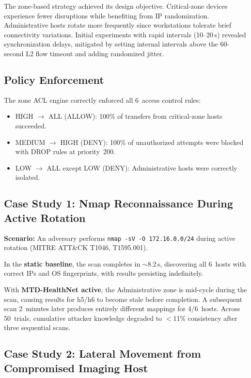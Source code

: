 \documentclass[conference]{IEEEtran}
\begin{document}
The zone-based strategy achieved its design objective. Critical-zone devices experience fewer disruptions while benefiting from IP randomization. Administrative hosts rotate more frequently since workstations tolerate brief connectivity variations. Initial experiments with rapid intervals (10--20\,s) revealed synchronization delays, mitigated by setting internal intervals above the 60-second L2 flow timeout and adding randomized jitter.

\subsection{Policy Enforcement}

The zone ACL engine correctly enforced all 6~access control rules:

\begin{itemize}
    \item HIGH $\rightarrow$ ALL (ALLOW): 100\% of transfers from critical-zone hosts succeeded.
    \item MEDIUM $\rightarrow$ HIGH (DENY): 100\% of unauthorized attempts were blocked with DROP rules at priority~200.
    \item LOW $\rightarrow$ ALL except LOW (DENY): Administrative hosts were correctly isolated.
\end{itemize}

\subsection{Case Study 1: Nmap Reconnaissance During Active Rotation}

\textbf{Scenario:} An adversary performs \texttt{nmap -sV -O 172.16.0.0/24} during active rotation (MITRE ATT\&CK T1046, T1595.001).

In the \textbf{static baseline}, the scan completes in $\sim$8.2\,s, discovering all 6~hosts with correct IPs and OS fingerprints, with results persisting indefinitely.

With \textbf{MTD-HealthNet active}, the Administrative zone is mid-cycle during the scan, causing results for h5/h6 to become stale before completion. A subsequent scan 2~minutes later produces entirely different mappings for 4/6~hosts. Across 50~trials, cumulative attacker knowledge degraded to $<$11\% consistency after three sequential scans.

\subsection{Case Study 2: Lateral Movement from Compromised Imaging Host}
\end{document}
